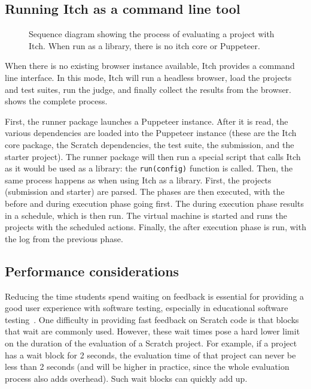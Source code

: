 \documentclass[../main]{subfiles}
\begin{document}
\subsection{Running Itch as a command line tool}\label{subsec:running-itch-as-a-command-line-tool}

\begin{figure}
    \begin{wide}
        
    \end{wide}
    \caption{Sequence diagram showing the process of evaluating a project with Itch. When run as a library, there is no itch core or Puppeteer.}
    \label{fig:itch-sequence-diagram}
\end{figure}

When there is no existing browser instance available, Itch provides a command line interface.
In this mode, Itch will run a headless browser, load the projects and test suites, run the judge, and finally collect the results from the browser.
 shows the complete process.

First, the runner package launches a Puppeteer instance.
After it is read, the various dependencies are loaded into the Puppeteer instance (these are the Itch core package, the Scratch dependencies, the test suite, the submission, and the starter project).
The runner package will then run a special script that calls Itch as it would be used as a library: the \texttt{run(config)} function is called.
Then, the same process happens as when using Itch as a library.
First, the projects (submission and starter) are parsed.
The phases are then executed, with the before and during execution phase going first.
The during execution phase results in a schedule, which is then run.
The virtual machine is started and runs the projects with the scheduled actions.
Finally, the after execution phase is run, with the log from the previous phase.

\subsection{Performance considerations}\label{subsec:performance-considerations}

Reducing the time students spend waiting on feedback is essential for providing a good user experience with software testing, especially in educational software testing~\autocite{sarsaSpeedingAutomatedAssessment2022}.
One difficulty in providing fast feedback on Scratch code is that blocks that wait are commonly used.
However, these wait times pose a hard lower limit on the duration of the evaluation of a Scratch project.
For example, if a project has a wait block for 2 seconds, the evaluation time of that project can never be less than 2 seconds (and will be higher in practice, since the whole evaluation process also adds overhead).
Such wait blocks can quickly add up.
\end{document}
